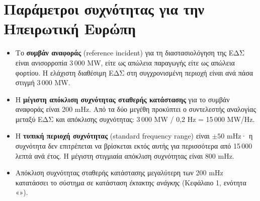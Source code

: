 \section{Παράμετροι συχνότητας για την Ηπειρωτική Ευρώπη}

\begin{itemize}
\item Το \textbf{συμβάν αναφοράς} (reference incident) για τη διαστασιολόγηση της ΕΔΣ είναι
      ανισορροπία 3\,000 MW, είτε ως απώλεια παραγωγής είτε ως απώλεια φορτίου. Η ελάχιστη
      διαθέσιμη ΕΔΣ στη συγχρονισμένη περιοχή είναι ανά πάσα στιγμή 3\,000 MW.
\item Η \textbf{μέγιστη απόκλιση συχνότητας σταθερής κατάστασης} για το συμβάν αναφοράς
      είναι 200 mHz. Από τα δύο μεγέθη προκύπτει ο συντελεστής αναλογίας μεταξύ ΕΔΣ και
      απόκλισης συχνότητας: 3\,000 MW / 0,2 Hz = 15\,000 MW/Hz.
\item Η \textbf{τυπική περιοχή συχνότητας} (standard frequency range) είναι $\pm 50$ mHz· η
      συχνότητα δεν επιτρέπεται να βρίσκεται εκτός αυτής για περισσότερα από
      15\,000 λεπτά ανά έτος. Η μέγιστη στιγμιαία απόκλιση συχνότητας είναι 800 mHz.
\item Απόκλιση συχνότητας σταθερής κατάστασης μεγαλύτερη των 200 mHz κατατάσσει το σύστημα
      σε κατάσταση \emph{έκτακτης ανάγκης} (Κεφάλαιο 1, ενότητα
      «»).
\end{itemize}

